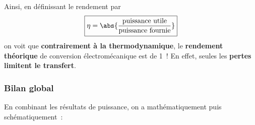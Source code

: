\documentclass[../../main/main.tex]{subfiles}
\begin{document}
Ainsi, en définissant le rendement par
\[
	\boxed{\eta = \abs{\frac{\text{puissance utile}}{\text{puissance fournie}}}}
\]
on voit que \textbf{contrairement à la thermodynamique}, le \textbf{rendement
	théorique} de conversion électromécanique est de 1~! En effet, seules les
\textbf{pertes limitent le transfert}.

\subsubsection{Bilan global}
\label{sssec:rlplmot_bilanglb}
En combinant les résultats de puissance, on a mathématiquement puis
schématiquement~:
\psw{%
	\[
		\boxed{
			\Pc\ind{gene}\sup{f} =
			\underbracket[1pt]{\Pc\ind{utile}}_{\dv{\Ec_c}{t}} + \Pc_J\sup{r} +
			\Pc_f\sup{f}
		}
	\]
}%
\begin{figure}[H]
	\centering
	\vspace{-15pt}
	\label{fig:rlplmot_bilan}
\end{figure}
\end{document}
